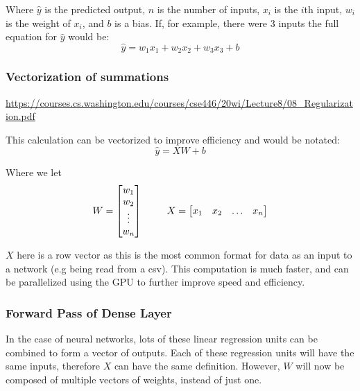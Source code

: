 \documentclass{article}
\begin{document}
    Where $\hat{y}$ is the predicted output, $n$ is the number of inputs, $x_i$ is the $i$th input, $w_i$ is the weight of $x_i$, and $b$ is a bias.
    If, for example, there were 3 inputs the full equation for $\hat{y}$ would be:
    \begin{displaymath}
        \hat{y} = w_1x_1 + w_2x_2 + w_3x_3 + b
    \end{displaymath}

    \subsubsection{Vectorization of summations}
    \noindent \url{https://courses.cs.washington.edu/courses/cse446/20wi/Lecture8/08_Regularization.pdf}

    This calculation can be vectorized to improve efficiency and would be notated:
    \begin{displaymath}
        \hat{y} = XW + b
    \end{displaymath}

    Where we let
    \begin{displaymath}
        W = \begin{bmatrix}
            w_1\\
            w_2\\
            \vdots\\
            w_n
        \end{bmatrix}\\
        \hspace{25px}
        X = \begin{bmatrix}
            x_1&
            x_2&
            \hdots&
            x_n
        \end{bmatrix}
    \end{displaymath}

    $X$ here is a row vector as this is the most common format for data as an input to a network (e.g being read from a csv).
    This computation is much faster, and can be parallelized using the GPU to further improve speed and efficiency.

    \subsubsection{Forward Pass of Dense Layer}
    In the case of neural networks, lots of these linear regression units can be combined to form a vector of outputs.
    Each of these regression units will have the same inputs, therefore $X$ can have the same definition. However, $W$ will now be
    composed of multiple vectors of weights, instead of just one.
\end{document}
